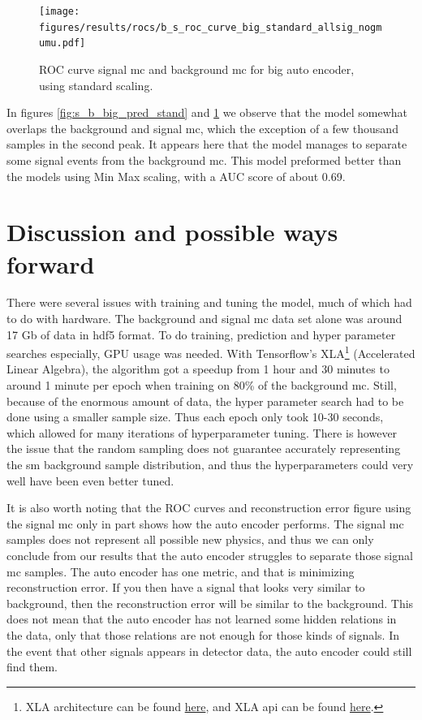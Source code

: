 \documentclass[ reprint, amsmath,amssymb, aps, nofootinbib]{revtex4-2}
\begin{document}
\begin{figure}[H]
    \centering
         \texttt{[image: figures/results/rocs/b\_s\_roc\_curve\_big\_standard\_allsig\_nogmumu.pdf]}
         \caption{ROC curve signal mc and background mc for big auto encoder, using standard scaling.}
         \label{fig:s_b_big_roc_stand}
\end{figure}




In figures \ref{fig:s_b_big_pred_stand} and \ref{fig:s_b_big_roc_stand} we observe that the model somewhat overlaps the background and signal mc, which the exception of a few thousand samples in the second peak. It appears here that the model manages to separate some signal events from the background mc. This model preformed better than the models using Min Max scaling, with a AUC score of about 0.69. \par 

\section{Discussion and possible ways forward}
There were several issues with training and tuning the model, much of which had to do with hardware. The background and signal mc data set alone was around 17 Gb of data in hdf5 format. To do training, prediction and hyper parameter searches especially, GPU usage was needed. With Tensorflow's XLA\footnote{XLA architecture can be found \href{https://www.tensorflow.org/xla/architecture}{here}, and XLA api can be found \href{https://www.tensorflow.org/xla}{here}.} (Accelerated Linear Algebra), the algorithm got a speedup from 1 hour and 30 minutes to around 1 minute per epoch when training on 80\% of the background mc. Still, because of the enormous amount of data, the hyper parameter search had to be done using a smaller sample size. Thus each epoch only took 10-30 seconds, which allowed for many iterations of hyperparameter tuning. There is however the issue that the random sampling does not guarantee accurately representing the sm background sample distribution, and thus the hyperparameters could very well have been even better tuned.  \par \par


It is also worth noting that the ROC curves and reconstruction error figure using the signal mc only in part shows how the auto encoder performs. The signal mc samples does not represent all possible new physics, and thus we can only conclude from our results that the auto encoder struggles to separate those signal mc samples. The auto encoder has one metric, and that is minimizing reconstruction error. If you then have a signal that looks very similar to background, then the reconstruction error will be similar to the background. This does not mean that the auto encoder has not learned some hidden relations in the data, only that those relations are not enough for those kinds of signals. In the event that other signals appears in detector data, the auto encoder could still find them. \par \par
\end{document}
